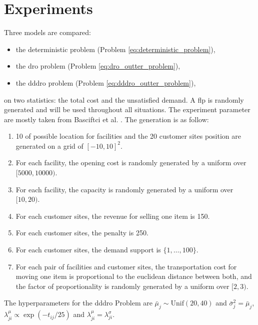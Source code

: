 \documentclass[12pt, letterpaper]{article}
\begin{document}
	\section{Experiments}
	Three models are compared:
	\begin{itemize}
		\item the deterministic problem (Problem \eqref{eq:deterministic_problem}),
		\item the \gls{dro} problem (Problem \eqref{eq:dro_outter_problem}),
		\item the \gls{dddro} problem (Problem \eqref{eq:dddro_outter_problem}),
	\end{itemize}
	on two statistics: the total cost and the unsatisfied demand. A \gls{flp} is randomly generated and will be used throughout all situations. The experiment parameter are mostly taken from Basciftci et al. \cite{basciftci_distributionally_2021}. The generation is as follow:
	\begin{enumerate}
		\item 10 of possible location for facilities and the 20 customer sites position are generated on a grid of $[-10, 10]^2$.
		\item For each facility, the opening cost is randomly generated by a uniform over $[5000, 10000)$.
		\item For each facility, the capacity is randomly generated by a uniform over $[10, 20)$.
		\item For each customer sites, the revenue for selling one item is 150.
		\item For each customer sites, the penalty is 250.
		\item For each customer sites, the demand support is $\{1, \dots, 100\}$.
		\item For each pair of facilities and customer sites, the transportation cost for moving one item is proportional to the euclidean distance between both, and the factor of proportionality is randomly generated by a uniform over $[2, 3)$.
	\end{enumerate}
	
	The hyperparameters for the \gls{dddro} Problem are $\bar{\mu}_j \sim \mathrm{Unif}(20, 40)$ and $\bar{\sigma}_j^2 = \bar{\mu}_j$, $\lambda_{j i}^\mu \propto \exp(-t_{ij} / 25)$ and $\lambda_{j i}^\mu = \lambda_{j i}^\sigma$.
	
\end{document}
